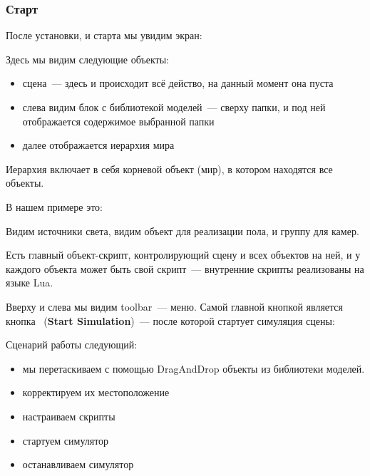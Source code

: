 \label{habr57tut}

\subsubsection{Старт}

После установки, и старта мы увидим экран:

Здесь мы видим следующие объекты:

\begin{itemize}[nosep]
	\item сцена\ --- здесь и происходит всё действо, на данный момент она 
		пуста
	\item слева видим блок с библиотекой моделей\ --- сверху папки, и под 
		ней отображается содержимое выбранной папки
\item далее отображается иерархия мира
\end{itemize}

Иерархия включает в себя корневой объект (мир), в котором находятся все объекты.

В нашем примере это:


Видим источники света, видим объект для реализации пола, и группу для камер.

Есть главный объект-скрипт, контролирующий сцену и всех объектов на ней, 
и у каждого объекта может быть свой скрипт\ --- внутренние скрипты реализованы 
на языке Lua.

Вверху и слева мы видим toolbar\ --- меню. Самой главной кнопкой является
кнопка \keys{\rms}\ (\textbf{Start Simulation})\ --- после которой стартует
симуляция сцены:


Сценарий работы следующий:
\begin{itemize}[nosep]
\item мы перетаскиваем с помощью DragAndDrop объекты из библиотеки моделей. 
\item корректируем их местоположение
\item настраиваем скрипты
\item стартуем симулятор
\item останавливаем симулятор
\end{itemize}


